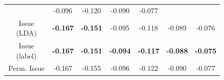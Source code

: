 \begin{figure}
\begin{tabular}{|c|cccccc|}
    & \hspace{-4pt} -0.096 \hspace{-5pt}
    & \hspace{-4pt} -0.120 \hspace{-5pt}
    & \hspace{-4pt} -0.090 \hspace{-5pt}
    & \hspace{-4pt} -0.077 \hspace{-4pt} \\
    Issue (LDA)
    & \hspace{-4pt} \textbf{-0.167} \hspace{-5pt}
    & \hspace{-4pt} \textbf{-0.151} \hspace{-5pt}
    & \hspace{-4pt} -0.095 \hspace{-5pt}
    & \hspace{-4pt} -0.118 \hspace{-5pt}
    & \hspace{-4pt} -0.089 \hspace{-5pt}
    & \hspace{-4pt} -0.076 \hspace{-4pt} \\
    Issue (label)
    & \hspace{-4pt} \textbf{-0.167} \hspace{-5pt}
    & \hspace{-4pt} \textbf{-0.151} \hspace{-5pt}
    & \hspace{-4pt} \textbf{-0.094} \hspace{-5pt}
    & \hspace{-4pt} \textbf{-0.117} \hspace{-5pt}
    & \hspace{-4pt} \textbf{-0.088} \hspace{-5pt}
    & \hspace{-4pt} \textbf{-0.075} \hspace{-4pt} \\
    \hspace{-5pt} Perm. Issue \hspace{-5pt}
    & \hspace{-4pt} -0.167 \hspace{-5pt}
    & \hspace{-4pt} -0.155 \hspace{-5pt}
    & \hspace{-4pt} -0.096 \hspace{-5pt}
    & \hspace{-4pt} -0.122 \hspace{-5pt}
    & \hspace{-4pt} -0.090 \hspace{-5pt}
    & \hspace{-4pt} -0.077 \hspace{-4pt} \\
    \hline
  \end{tabular}
  \normalsize
  \label{fig:session_comparison}
\end{figure}

